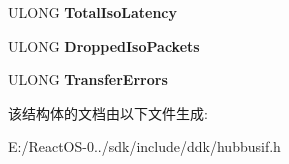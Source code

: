 \begin{DoxyCompactItemize}
\item 
\mbox{\label{struct___u_s_b___d_e_v_i_c_e___p_e_r_f_o_r_m_a_n_c_e___i_n_f_o__0_aae72ccf275f9687289cc309233ebd716}} 
U\+L\+O\+NG {\bfseries Total\+Iso\+Latency}
\item 
\mbox{\label{struct___u_s_b___d_e_v_i_c_e___p_e_r_f_o_r_m_a_n_c_e___i_n_f_o__0_ab99f5abad6e35721ea4576d148f3ee08}} 
U\+L\+O\+NG {\bfseries Dropped\+Iso\+Packets}
\item 
\mbox{\label{struct___u_s_b___d_e_v_i_c_e___p_e_r_f_o_r_m_a_n_c_e___i_n_f_o__0_a6e51be120254978e58b2ede8f1c12f91}} 
U\+L\+O\+NG {\bfseries Transfer\+Errors}
\end{DoxyCompactItemize}


该结构体的文档由以下文件生成\+:\begin{DoxyCompactItemize}
\item 
E\+:/\+React\+O\+S-\/0../sdk/include/ddk/hubbusif.\+h\end{DoxyCompactItemize}
